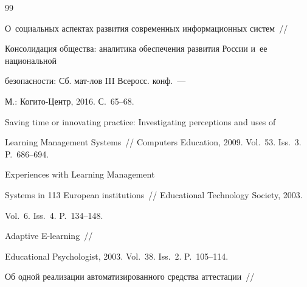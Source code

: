 {\small\frenchspacing


{%




\begin{thebibliography}{99}





\vspace*{-3pt}









О~социальных аспектах развития современных информационных систем~/\!\!/ 


Консолидация общества: аналитика обеспечения развития России и~ее национальной 


безопасности: Сб. мат-лов III Всеросс. конф.~--- 


М.: Когито-Центр, 2016. С.~65--68.









Saving time or innovating practice: Investigating perceptions and uses of 


Learning Management Systems~/\!\!/ Computers Education, 2009. Vol.~53. Iss.~3. P.~686--694.





  Experiences with Learning Management 


Systems in 113 European institutions~/\!\!/ Educational Technology Society, 2003. 


Vol.~6. Iss.~4. P.~134--148.





  Adaptive E-learning~/\!\!/ 


Educational Psychologist, 2003. Vol.~38. Iss.~2. P.~105--114.









Об одной реализации автоматизированного средства аттестации~/\!\!/ 



\end{thebibliography}}}
